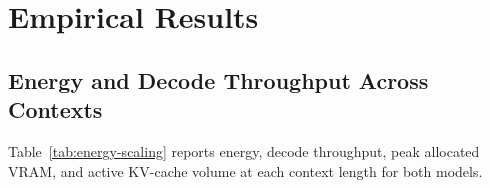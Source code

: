 \documentclass[sigconf,nonacm]{acmart}
\begin{document}
\section{Empirical Results}

\subsection{Energy and Decode Throughput Across Contexts}
\label{sec:energy-scaling}

Table~\ref{tab:energy-scaling} reports energy, decode throughput, peak allocated VRAM, and active KV-cache volume at each context length for both models.
\end{document}
